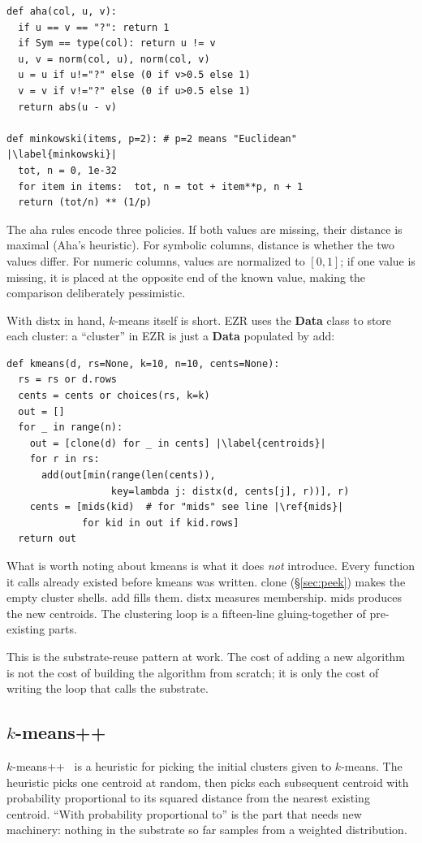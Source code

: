 \documentclass[AMA,STIX2COL]{WileyNJDv5}
\newcommand{\IT}{{\sffamily EZR}}
\newcommand{\cls}[1]{%
  \setlength{\fboxsep}{1.5pt}%
  \colorbox{clsbg}{\sffamily\bfseries{#1}}%
}
\begin{document}
{\begin{verbatim}
def aha(col, u, v):
  if u == v == "?": return 1
  if Sym == type(col): return u != v
  u, v = norm(col, u), norm(col, v)
  u = u if u!="?" else (0 if v>0.5 else 1)
  v = v if v!="?" else (0 if u>0.5 else 1)
  return abs(u - v)

def minkowski(items, p=2): # p=2 means "Euclidean"  |\label{minkowski}|
  tot, n = 0, 1e-32
  for item in items:  tot, n = tot + item**p, n + 1
  return (tot/n) ** (1/p)
\end{verbatim}
The \textsf{aha} rules encode three   policies. If both
values are missing, their distance is maximal (Aha's
heuristic). For symbolic columns, distance is whether the two
values differ. For numeric columns, values are normalized to
$[0,1]$; if one value is missing, it is placed at the opposite
end of the known value, making the comparison deliberately
pessimistic.

With \textsf{distx} in hand, $k$-means itself is short. EZR uses
the \cls{Data} class to store each cluster: a ``cluster'' in
\IT{} is just a \cls{Data} populated by \textsf{add}:

\begin{verbatim}
def kmeans(d, rs=None, k=10, n=10, cents=None):
  rs = rs or d.rows
  cents = cents or choices(rs, k=k)
  out = []
  for _ in range(n):
    out = [clone(d) for _ in cents] |\label{centroids}|
    for r in rs:
      add(out[min(range(len(cents)),
                  key=lambda j: distx(d, cents[j], r))], r)
    cents = [mids(kid)  # for "mids" see line |\ref{mids}|
             for kid in out if kid.rows]
  return out
\end{verbatim}
What is worth noting about \textsf{kmeans} is what it does
\emph{not} introduce. Every function it calls already existed
before \textsf{kmeans} was written. \textsf{clone}
(\S\ref{sec:peek}) makes the empty cluster shells. \textsf{add}
fills them. \textsf{distx} measures membership. \textsf{mids}
produces the new centroids. The clustering loop is a
fifteen-line gluing-together of pre-existing parts.

This is the substrate-reuse pattern at work. The cost of
adding a new algorithm is not the cost of building the
algorithm from scratch; it is only the cost of writing the
loop that calls the substrate.

\subsection{$k$-means++}

$k$-means++~\cite{arthur2007kmeanspp} is a heuristic for picking
the initial clusters given to $k$-means. The heuristic picks one
centroid at random, then picks each subsequent centroid with
probability proportional to its squared distance from the
nearest existing centroid. ``With probability proportional to''
is the part that needs new machinery: nothing in the substrate
so far samples from a weighted distribution.

}
\end{document}
